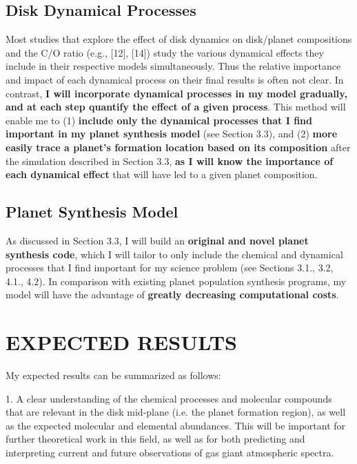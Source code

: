 \documentclass[12pt, letterpaper]{article}
\begin{document}
\subsection{Disk Dynamical Processes} 

Most studies that explore the effect of disk dynamics on disk/planet compositions and the C/O ratio (e.g., [12], [14]) study the various dynamical effects they include in their respective models simultaneously. Thus the relative importance and impact of each dynamical process on their final results is often not clear. In contrast, \textbf{I will incorporate dynamical processes in my model gradually, and at each step quantify the effect of a given process}. This method will enable me to (1) \textbf{include only the dynamical processes that I find important in my planet synthesis model} (see Section 3.3), and (2) \textbf{more easily trace a planet's formation location based on its composition} after the simulation described in Section 3.3, \textbf{as I will know the importance of each dynamical effect} that will have led to a given planet composition. 

\subsection{Planet Synthesis Model}

As discussed in Section 3.3, I will build an \textbf{original and novel planet synthesis code}, which I will tailor to only include the chemical and dynamical processes that I find important for my science problem (see Sections 3.1., 3.2, 4.1., 4.2). In comparison with existing planet population synthesis programs, my model will have the advantage of \textbf{greatly decreasing computational costs}.  


\section{EXPECTED RESULTS}


My expected results can be summarized as follows:

1. A clear understanding of the chemical processes and molecular compounds that are relevant in the disk mid-plane (i.e. the planet formation region), as well as the expected molecular and elemental abundances. This will be important for further theoretical work in this field, as well as for both predicting and interpreting current and future observations of gas giant atmospheric spectra.
\end{document}
